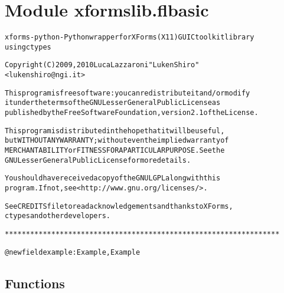 %
%
%


\section{Module xformslib.flbasic}

    \label{xformslib:flbasic}
\begin{alltt}

xforms-python - Python wrapper for XForms (X11) GUI C toolkit library
using ctypes

Copyright (C) 2009, 2010  Luca Lazzaroni "LukenShiro"
    {\textless}lukenshiro@ngi.it{\textgreater}

This program is free software: you can redistribute it and/or modify
it under the terms of the GNU Lesser General Public License as
published by the Free Software Foundation, version 2.1 of the License.

This program is distributed in the hope that it will be useful,
but WITHOUT ANY WARRANTY; without even the implied warranty of
MERCHANTABILITY or FITNESS FOR A PARTICULAR PURPOSE. See the
GNU Lesser General Public License for more details.

You should have received a copy of the GNU LGPL along with this
program. If not, see {\textless}http://www.gnu.org/licenses/{\textgreater}.

See CREDITS file to read acknowledgements and thanks to XForms,
ctypes and other developers.

*****************************************************************


@newfield example: Example, Example
\end{alltt}



  \subsection{Functions}

